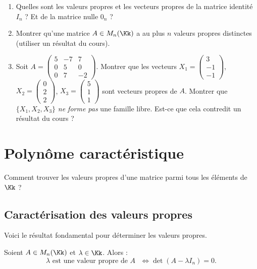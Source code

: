 \documentclass[11pt, class=report,crop=false]{standalone}
\begin{document}
\begin{miniexercices}
\begin{enumerate}
  \item Quelles sont les valeurs propres et les vecteurs propres de la matrice identité
  $I_n$ ? Et de la matrice nulle $0_n$ ?
  
  \item Montrer qu'une matrice $A \in M_n(\Kk)$ a au plus $n$ valeurs propres distinctes (utiliser un résultat du cours).
  
  \item Soit $A = \left(\begin{smallmatrix}
  5 & -7 & 7 \\
0 & 5 & 0 \\
0 & 7 & -2\end{smallmatrix}\right)$.
  Montrer que les vecteurs 
  $X_1 = \left(\begin{smallmatrix}3\\-1\\-1 \end{smallmatrix}\right)$, $X_2 = \left(\begin{smallmatrix}0\\2\\2\end{smallmatrix}\right)$, $X_3 =  \left(\begin{smallmatrix}5\\1\\1\end{smallmatrix}\right)$ 
  sont vecteurs propres de $A$. Montrer que 
  $\{X_1 , X_2 , X_3\}$ \emph{ne forme pas} une famille libre. Est-ce que cela contredit un résultat
  du cours ? 
\end{enumerate}
\end{miniexercices}

\section{Polynôme caractéristique}

Comment trouver les valeurs propres d'une matrice parmi tous les éléments de $\Kk$  ?

\subsection{Caractérisation des valeurs propres}

Voici le résultat fondamental pour déterminer les valeurs propres.

\begin{proposition}
\label{prop:vprac}
Soient $A \in M_n(\Kk)$ et $\lambda \in \Kk$. Alors :
\[\lambda \text{ est une valeur propre de $A$ } \iff \det (A-\lambda I_n) = 0 .\]
\end{proposition}
\end{document}
